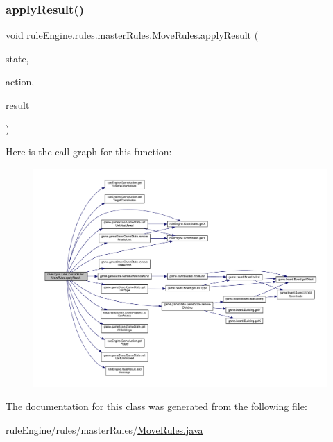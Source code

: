 \subsubsection{\texorpdfstring{apply\+Result()}{applyResult()}}
{\footnotesize\ttfamily void rule\+Engine.\+rules.\+master\+Rules.\+Move\+Rules.\+apply\+Result (\begin{DoxyParamCaption}\item[{\mbox{\hyperlink{classgame_1_1game_state_1_1_game_state}{Game\+State}}}]{state,  }\item[{\mbox{\hyperlink{classrule_engine_1_1_game_action}{Game\+Action}}}]{action,  }\item[{\mbox{\hyperlink{classrule_engine_1_1_rule_result}{Rule\+Result}}}]{result }\end{DoxyParamCaption})\hspace{0.3cm}{\ttfamily [inline]}}

Here is the call graph for this function\+:
\nopagebreak
\begin{figure}[H]
\begin{center}
\leavevmode
\includegraphics[width=350pt]{classrule_engine_1_1rules_1_1master_rules_1_1_move_rules_a15001f0b477c2f22e75d9d4055019c8b_cgraph}
\end{center}
\end{figure}


The documentation for this class was generated from the following file\+:\begin{DoxyCompactItemize}
\item 
rule\+Engine/rules/master\+Rules/\mbox{\hyperlink{_move_rules_8java}{Move\+Rules.\+java}}\end{DoxyCompactItemize}
